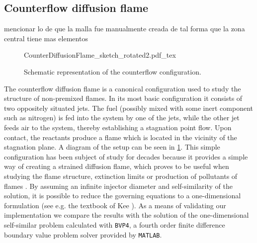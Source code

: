 
\subsection{Counterflow diffusion flame}\label{ss:CDF}
mencionar lo de que la malla fue manualmente creada de tal forma que  la zona central tiene mas elementos 
\begin{figure}[b]
	\begin{center}
		\def\svgwidth{0.8\textwidth}
		{CounterDiffusionFlame_sketch_rotated2.pdf_tex}
		\caption{Schematic representation of the counterflow configuration.}
		\label{fig:CDFScheme}
	\end{center}
\end{figure}
The counterflow diffusion flame is a canonical configuration used to study the structure of non-premixed flames. In its most basic configuration it consists of two oppositely situated jets. The fuel (possibly mixed with some inert component such as nitrogen) is fed into the system by one of the jets, while the other jet feeds air to the system, thereby establishing a stagnation point flow. Upon contact, the reactants produce a flame which is located in the vicinity of the stagnation plane. A diagram of the setup can be seen in \cref{fig:CDFScheme}. This simple configuration has been subject of study for decades  because it provides a simple way of creating a strained diffusion flame, which proves to be useful when studying the flame structure, extinction limits or production of pollutants of flames \cite{pandyaStructureFlatCounterFlow1964} \cite{spaldingTheoryMixingChemical1961} \cite{keyesFlameSheetStarting1987}. By assuming an infinite injector diameter and self-similarity of the solution, it is possible to reduce the governing equations to a one-dimensional formulation (see e.g. the textbook of Kee \cite{keeChemicallyReactingFlow2003}). As a means of validating our implementation we compare the results with the solution of the one-dimensional self-similar problem calculated with \lstinline|BVP4|, a fourth order finite difference boundary value problem solver provided by \lstinline|MATLAB|.

